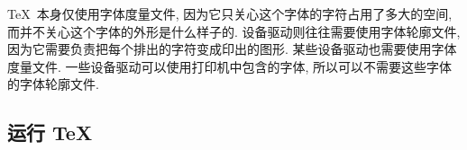 \TeX\ 本身仅使用字体度量文件, 因为它只关心这个字体的字符占用了多大的空间,
而并不关心这个字体的外形是什么样子的.
设备驱动则往往需要使用字体轮廓文件,
因为它需要负责把每个排出的字符变成印出的图形.
某些设备驱动也需要使用字体度量文件.
一些设备驱动可以使用打印机中包含的字体,
所以可以不需要这些字体的字体轮廓文件.


\subsection{运行 \TeX}

